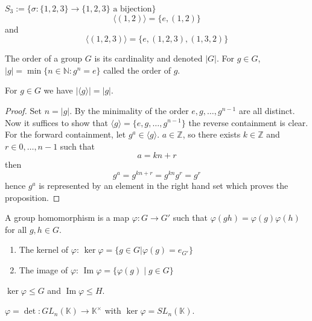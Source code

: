 \documentclass[12pt]{article}
\begin{document}
\begin{example}
    $S_3 := \{ \sigma: \{ 1, 2, 3 \} \to \{ 1, 2, 3 \} \text{ a bijection} \}$
    \[ \langle (1, 2) \rangle = \{ e, (1, 2) \} \]
    and
    \[ \langle (1, 2, 3) \rangle = \{ e, (1, 2, 3), (1, 3, 2) \} \]
\end{example}

\begin{definition}
    The order of a group $G$ is its cardinality and denoted $|G|$.
    For $g \in G$, $|g| = \min \{ n \in \mathbb N : g^n = e \}$
    called the order of $g$.
\end{definition}

\begin{proposition}
    For $g \in G$ we have $|\langle g \rangle| = |g|$.
\end{proposition}
\begin{proof}
    Set $n = |g|$. By the minimality of the order $e, g, \ldots, g^{n-1}$ are all distinct.
    Now it suffices to show that $\langle g \rangle  = \{ e, g, \ldots, g^{n-1} \}$
    the reverse containment is clear. For the forward containment, let $g^a \in \langle g \rangle $.
    $a \in \mathbb Z$, so there exists $k \in \mathbb Z$ and $r \in {0, \ldots, n-1}$ such that
    \[ a = kn + r \]
    then
    \[ g^a = g^{kn + r} = g^{kn}g^r = g^r \]
    hence $g^a$ is represented by an element in the right hand set which proves the proposition.
\end{proof}

\begin{definition}
    A group homomorphism is a map $\varphi: G \to G'$ such that
    $\varphi(gh) = \varphi(g)\varphi(h)$ for all $g, h \in G$.

    \begin{enumerate}
    \item The kernel of $\varphi$: $\ker \varphi = \{ g \in G | \varphi(g) = e_{G'} \}$
    \item The image of $\varphi$: $\operatorname{Im} \varphi = \{ \varphi(g) \mid g \in G \}$
    \end{enumerate}
\end{definition}

\begin{proposition}
    $\ker \varphi \leq G$ and $\operatorname{Im} \varphi \leq H$.
\end{proposition}

\begin{example}
        $\varphi = \det: GL_n(\mathbb K) \to \mathbb K^\times$ with $\ker \varphi = SL_n(\mathbb K)$.
\end{example}
\end{document}
